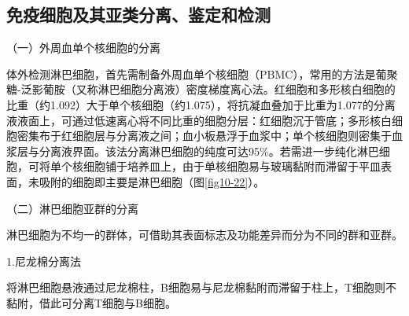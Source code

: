 \subsection{免疫细胞及其亚类分离、鉴定和检测}

（一）外周血单个核细胞的分离

体外检测淋巴细胞，首先需制备外周血单个核细胞（PBMC），常用的方法是葡聚糖-泛影葡胺（又称淋巴细胞分离液）密度梯度离心法。红细胞和多形核白细胞的比重（约1.092）大于单个核细胞（约1.075），将抗凝血叠加于比重为1.077的分离液液面上，可通过低速离心将不同比重的细胞分层：红细胞沉于管底；多形核白细胞密集布于红细胞层与分离液之间；血小板悬浮于血浆中；单个核细胞则密集于血浆层与分离液界面。该法分离淋巴细胞的纯度可达95\%。若需进一步纯化淋巴细胞，可将单个核细胞铺于培养皿上，由于单核细胞易与玻璃黏附而滞留于平皿表面，未吸附的细胞即主要是淋巴细胞（图\ref{fig10-22}）。

（二）淋巴细胞亚群的分离

淋巴细胞为不均一的群体，可借助其表面标志及功能差异而分为不同的群和亚群。

1.尼龙棉分离法

将淋巴细胞悬液通过尼龙棉柱，B细胞易与尼龙棉黏附而滞留于柱上，T细胞则不黏附，借此可分离T细胞与B细胞。

